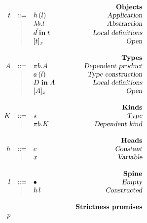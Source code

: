 \begin{figure}

\begin{center}
\begin{math}
\begin{array}{rclr}
&&&\qquad\textsl{\bf Objects}\\
t 

&::=& 
h\,(l) 
& \qquad\textsl{Application}
\\

&|&
\lambda b. t
& \qquad\textsl{Abstraction}
\\

&|&
\vec{d} \;\textbf{in}\; t
& \qquad\textsl{Local definitions}
\\

&|&
[ t ]_{x}
& \qquad\textsl{Open}
\\
\\
&&&\qquad\textsl{\bf Types}\\
A

&::=& 
\pi b. A
& \qquad\textsl{Dependent product}
\\

&|& 
a\,(l)
& \qquad\textsl{Type construction}
\\

&|& 
D \;\textbf{in}\; A
& \qquad\textsl{Local definitions}
\\


&|& 
[ A ]_{x}
& \qquad\textsl{Open}
\\
\\
&&&\qquad\textsl{\bf Kinds}\\
K

&::=&
\star
& \qquad\textsl{Type}
\\

&|&
\pi b. K
& \qquad\textsl{Dependent kind}
\\
\\

&&&\qquad\textsl{\bf Heads}\\
h

&::=& 
c
& \qquad\textsl{Constant}
\\
&|& 
x
& \qquad\textsl{Variable}
\\
\\
&&&\qquad\textsl{\bf Spine}\\
l

&::=& \bullet
& \qquad\textsl{Empty}
\\
&|& h\,l
& \qquad\textsl{Constructed}
\\
\\
&&&\qquad\textsl{\bf Strictness promises}\\
p 


\end{array}
\end{math}
\end{center}
\end{figure}
